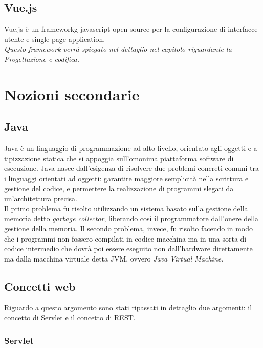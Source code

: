 \subsection{Vue.js}

Vue.js è un \gls{frameworkg} javascript open-source per la configurazione di interfacce utente e single-page application.\\

\textit{Questo framework verrà spiegato nel dettaglio nel capitolo riguardante la Progettazione e codifica.}

\section{Nozioni secondarie}

\subsection{Java}

Java è un linguaggio di programmazione ad alto livello, orientato agli oggetti e a tipizzazione statica che si appoggia sull'omonima piattaforma software di esecuzione. Java nasce dall'esigenza di risolvere due problemi concreti comuni tra i linguaggi orientati ad oggetti: garantire maggiore semplicità nella scrittura e gestione del codice, e permettere la realizzazione di programmi slegati da un'architettura precisa.\\
Il primo problema fu risolto utilizzando un sistema basato sulla gestione della memoria detto \textit{garbage collector}, liberando così il programmatore dall'onere della gestione della memoria. Il secondo problema, invece, fu risolto facendo in modo che i programmi non fossero compilati in codice macchina ma in una sorta di codice intermedio che dovrà poi essere eseguito non dall'hardware direttamente ma dalla macchina virtuale detta JVM, ovvero \textit{Java Virtual Machine}.\\

\subsection{Concetti web}

Riguardo a questo argomento sono stati ripassati in dettaglio due argomenti: il concetto di Servlet e il concetto di REST.

\subsubsection{Servlet}

